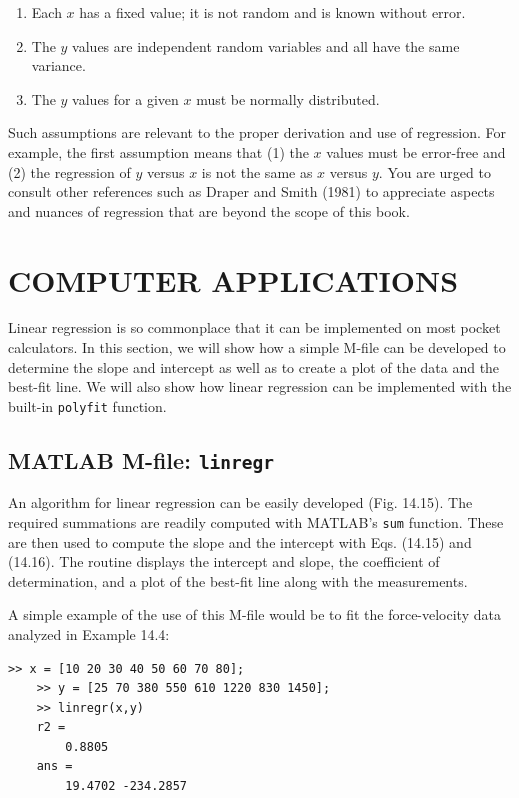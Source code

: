 \documentclass[../main.tex]{subfiles}
\begin{document}
\begin{enumerate}
	\item Each $x$ has a fixed value; it is not random and is known without error.
	\item The $y$ values are independent random variables and all have the same variance.
	\item The $y$ values for a given $x$ must be normally distributed.
\end{enumerate}

Such assumptions are relevant to the proper derivation and use of regression. For example, the first assumption means that (1) the $x$ values must be error-free and (2) the regression of $y$ versus $x$ is not the same as $x$ versus $y$. You are urged to consult other references such as Draper and Smith (1981) to appreciate aspects and nuances of regression that are beyond the scope of this book.

\label{cha:cha_P_14_5}
\section{COMPUTER APPLICATIONS}

\noindent Linear regression is so commonplace that it can be implemented on most pocket calculators. In this section, we will show how a simple M-file can be developed to determine the slope and intercept as well as to create a plot of the data and the best-fit line. We will also show how linear regression can be implemented with the built-in \texttt{polyfit} function.

\label{cha:cha_P_14_5_1}
\subsection{MATLAB M-file: \texttt{linregr}}
\noindent An algorithm for linear regression can be easily developed (Fig. 14.15). The required summations are readily computed with MATLAB's \texttt{sum} function. These are then used to compute the slope and the intercept with Eqs. (14.15) and (14.16). The routine displays the intercept and slope, the coefficient of determination, and a plot of the best-fit line along with the measurements.

A simple example of the use of this M-file would be to fit the force-velocity data analyzed in Example 14.4:

\begin{lstlisting}[numbers=none]
	>> x = [10 20 30 40 50 60 70 80];
	>> y = [25 70 380 550 610 1220 830 1450];
	>> linregr(x,y)
	r2 =
		0.8805
	ans =
		19.4702 -234.2857
\end{lstlisting}
\end{document}
